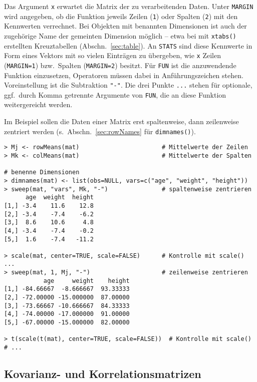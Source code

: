 Das Argument \lstinline!x! erwartet die Matrix der zu verarbeitenden Daten. Unter \lstinline!MARGIN! wird angegeben, ob die Funktion jeweils Zeilen (\lstinline!1!) oder Spalten (\lstinline!2!) mit den Kennwerten verrechnet. Bei Objekten mit benannten Dimensionen ist auch der zugehörige Name der gemeinten Dimension möglich -- etwa bei mit \lstinline!xtabs()! erstellten Kreuztabellen (Abschn.\ \ref{sec:table}). An \lstinline!STATS! sind diese Kennwerte in Form eines Vektors mit so vielen Einträgen zu übergeben, wie \lstinline!x! Zeilen (\lstinline!MARGIN=1!) bzw.\ Spalten (\lstinline!MARGIN=2!) besitzt. Für \lstinline!FUN! ist die anzuwendende Funktion einzusetzen, Operatoren müssen dabei in Anführungszeichen stehen. Voreinstellung ist die Subtraktion \lstinline!"-"!. Die drei Punkte \lstinline!...! stehen für optionale, ggf.\ durch Komma getrennte Argumente von \lstinline!FUN!, die an diese Funktion weitergereicht werden.

Im Beispiel sollen die Daten einer Matrix erst spaltenweise, dann zeilenweise zentriert werden (s.\ Abschn.\ \ref{sec:rowNames} für \lstinline!dimnames()!).
\begin{lstlisting}
> Mj <- rowMeans(mat)                       # Mittelwerte der Zeilen
> Mk <- colMeans(mat)                       # Mittelwerte der Spalten

# benenne Dimensionen
> dimnames(mat) <- list(obs=NULL, vars=c("age", "weight", "height"))
> sweep(mat, "vars", Mk, "-")               # spaltenweise zentrieren
      age  weight  height
[1,] -3.4    11.6    12.8
[2,] -3.4    -7.4    -6.2
[3,]  8.6    10.6     4.8
[4,] -3.4    -7.4    -0.2
[5,]  1.6    -7.4   -11.2

> scale(mat, center=TRUE, scale=FALSE)      # Kontrolle mit scale() ...
> sweep(mat, 1, Mj, "-")                    # zeilenweise zentrieren
           age     weight    height
[1,] -84.66667  -8.666667  93.33333
[2,] -72.00000 -15.000000  87.00000
[3,] -73.66667 -10.666667  84.33333
[4,] -74.00000 -17.000000  91.00000
[5,] -67.00000 -15.000000  82.00000

> t(scale(t(mat), center=TRUE, scale=FALSE))  # Kontrolle mit scale()
# ...
\end{lstlisting}

\subsection{Kovarianz- und Korrelationsmatrizen}
\label{sec:covMat}

